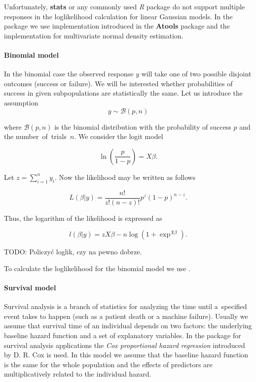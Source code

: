Unfortunately, \textbf{stats} or any commonly used \emph{R} package do not support multiple responses in the loglikelihood calculation for linear Gaussian models. In the package we use  implementation introduced in the \textbf{Atools} package \citep{atools} and the  \citep{mvtnorm} implementation for multivariate normal density estimation.


\paragraph{Binomial model}

In the binomial case the observed response $y$ will take one of two possible disjoint outcomes (success or failure). We will be interested whether probabilities of success in given subpopulations are statistically the same. Let us introduce the assumption
$$y \sim \mathcal{B}\left(p, n\right)$$

where $\mathcal{B}\left(p,n\right)$ is the binomial distribution with the probability of success $p$ and the number~of~trials~$n$. We consider the logit model 

$$\ln\left(\frac{p}{1 - p}\right) = X \beta.$$

Let $z = \sum_{i = 1}^n y_i$. Now the likelihood may be written as follows  \citep{binom}

$$L\left(\beta | y \right) = 
\frac{n!}{z!\left(n - z\right)!}p ^z \left(1 - p\right)^{n - z}.$$

Thus, the logarithm of the likelihood is expressed as 

$$l\left(\beta|y\right) = zX\beta - n \log{\left(1 + \exp^{X\beta}\right)}.$$

TODO: Policzyć loglik, czy na pewno dobrze.

To calculate the loglikelihood for the binomial model we use .

\paragraph{Survival model}

Survival analysis is a branch of statistics for analyzing the time until a~specified event takes to happen (such as a patient death or a machine failure). Usually we assume that survival time of an individual depends on two factors: the underlying baseline hazard function and a set of explanatory variables. In the package for survival analysis applications the \emph{Cox proportional hazard regression} introduced by D. R. Cox \citep{coxph} is used. In this model we assume that the baseline hazard function is the same for the whole population and the effects of predictors are multiplicatively related to the individual hazard. 

